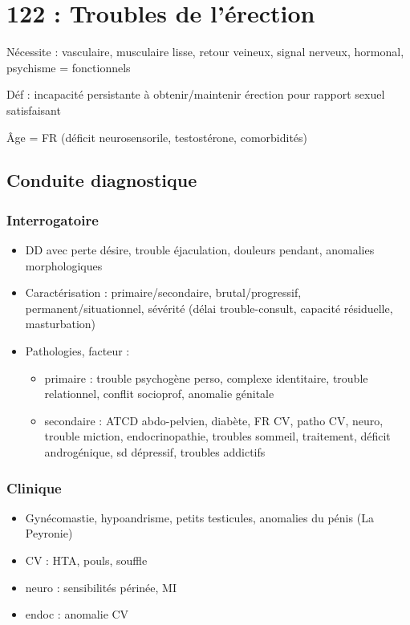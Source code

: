 \documentclass[11pt]{article}
\begin{document}
\section{122 : Troubles de l'érection}
\label{sec:org2ecaf27}
Nécessite : vasculaire, musculaire lisse, retour veineux, signal  nerveux,
hormonal, psychisme = fonctionnels

Déf : incapacité persistante à obtenir/maintenir érection pour rapport sexuel satisfaisant

Âge = FR (déficit neurosensorile, \inc testostérone, comorbidités)

\subsection{Conduite  diagnostique}
\label{sec:org91e6a37}
\subsubsection{Interrogatoire}
\label{sec:org6de3b50}
\begin{itemize}
\item DD avec perte désire, trouble éjaculation, douleurs pendant, anomalies morphologiques
\item Caractérisation : primaire/secondaire, brutal/progressif,
permanent/situationnel, sévérité (délai trouble-consult, capacité résiduelle,
masturbation)
\item Pathologies, facteur :
\begin{itemize}
\item primaire : trouble psychogène perso, complexe identitaire, trouble
relationnel, conflit socioprof, anomalie génitale
\item secondaire : ATCD abdo-pelvien, diabète, FR CV, patho CV, neuro, trouble
miction, endocrinopathie, troubles sommeil, traitement, déficit
androgénique, sd dépressif, troubles addictifs
\end{itemize}
\end{itemize}
\subsubsection{Clinique}
\label{sec:orgd2f0116}
\begin{itemize}
\item Gynécomastie, hypoandrisme, petits testicules, anomalies du pénis (La Peyronie)
\item CV : HTA, pouls, souffle
\item neuro : sensibilités périnée, MI
\item endoc : anomalie CV
\end{itemize}
\end{document}
